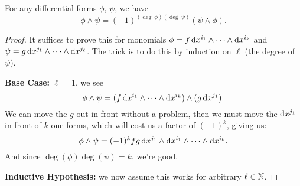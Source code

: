 \begin{theorem}
  For any differential forms $\phi$, $\psi$, we have
  \begin{equation}
\phi\wedge\psi=(-1)^{(\deg~\phi)(\deg~\psi)}(\psi\wedge\phi).
  \end{equation}
\end{theorem}
\begin{proof}
  It suffices to prove this for monomials $\phi=f\,\mathrm{d} x^{i_{1}}\wedge\dots\wedge\mathrm{d} x^{i_{k}}$
  and $\psi=g\,\mathrm{d} x^{j_{1}}\wedge\dots\wedge\mathrm{d} x^{j_{\ell}}$. The trick
  is to do this by induction on $\ell$ (the degree of $\psi$).

  \textbf{Base Case:} $\ell=1$, we see
  \begin{equation}
\phi\wedge\psi = (f\,\mathrm{d} x^{i_{1}}\wedge\dots\wedge\mathrm{d} x^{i_{k}})\wedge(g\,\mathrm{d} x^{j_{1}}).
  \end{equation}
  We can move the $g$ out in front without a problem, then we must move
  the $\mathrm{d} x^{j_{1}}$ in front of $k$ one-forms, which will cost us a
  factor of $(-1)^{k}$, giving us:
  \begin{equation}
\phi\wedge\psi = (-1)^{k} fg\,\mathrm{d} x^{j_{1}}\wedge\mathrm{d} x^{i_{1}}\wedge\dots\wedge\mathrm{d} x^{i_{k}}.
  \end{equation}
  And since $\deg(\phi)\deg(\psi)=k$, we're good.

  \textbf{Inductive Hypothesis:}
  we now assume this works for arbitrary $\ell\in\mathbb{N}$.


\end{proof}
